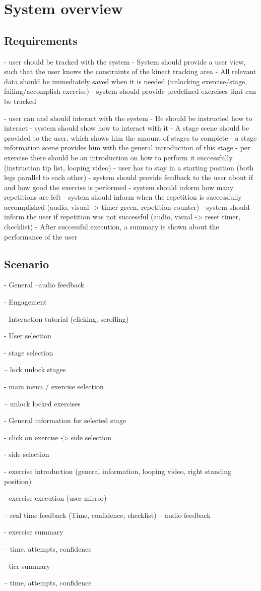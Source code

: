 \section{System overview}\label{3_1_requirements}

\subsection{Requirements}

- user should be tracked with the system
- System should provide a user view, such that the user knows the constraints of the kinect tracking area
- All relevant data should be immediately saved when it is needed (unlocking exercise/stage, failing/accomplish exercise)
- system should provide predefined exercises that can be tracked

- user can and should interact with the system
- He should be instructed how to interact
- system should show how to interact with it
- A stage scene should be provided to the user, which shows him the amount of stages to complete
- a stage information scene provides him with the general introduction of this stage
- per exercise there should be an introduction on how to perform it successfully (instruction tip list, looping video)
- user has to stay in a starting position (both legs parallel to each other)
- system should provide feedback to the user about if and how good the exercise is performed
- system should inform how many repetitions are left
- system should inform when the repetition is successfully accomplished (audio, visual -> timer green, repetition counter)
- system should inform the user if repetition was not successful (audio, visual -> reset timer, checklist)
- After successful execution, a summary is shown about the performance of the user

\subsection{Scenario}\label{3_1_requirements_scenario}

- General
--audio feedback

- Engagement

- Interaction tutorial (clicking, scrolling)

- User selection

- stage selection

-- lock unlock stages

- main menu / exercise selection

-- unlock locked exercises

- General information for selected stage

- click on exercise -> side selection

- side selection

- exercise introduction (general information, looping video, right standing position)

- exercise execution (user mirror)

-- real time feedback (Time, confidence, checklist)
-- audio feedback

- exercise summary

-- time, attempts, confidence

- tier summary

-- time, attempts, confidence